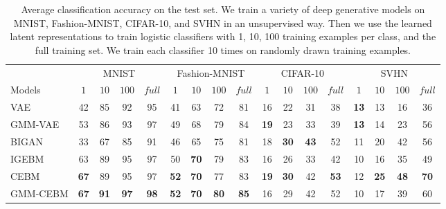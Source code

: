 \documentclass{article}
\begin{document}
\setlength{\tabcolsep}{6pt}
\begin{table}[!t]
\caption{Average classification accuracy on the test set. We train a variety of deep generative models on MNIST, Fashion-MNIST, CIFAR-10, and SVHN in an unsupervised way. Then we use the learned latent representations to train logistic classifiers with 1, 10, 100 training examples per class, and the full training set. We train each classifier 10 times on randomly drawn training examples.} 
\centering
\vspace*{0.5ex}
\begin{tabular}{l|cccc||cccc||cccc||cccc}
\toprule
 & \multicolumn{4}{c||}{MNIST} & \multicolumn{4}{c||}{Fashion-MNIST} & \multicolumn{4}{c||}{CIFAR-10} & \multicolumn{4}{c}{SVHN}\\
Models & $1$ & $10$  & $100$ & $full$ & $1$ & $10$  & $100$ & $full$ & $1$ & $10$  & $100$ & $full$ & $1$ & $10$  & $100$ & $full$ \\
\midrule
VAE & 42 & 85 & 92 & 95 & 41 & 63 & 72 & 81 & 16 & 22 & 31 & 38 & \textbf{13} & 13 & 16 & 36\\
GMM-VAE & 53 & 86 & 93 & 97 & 49 & 68 & 79 & 84 & \textbf{19} & 23 & 33 & 39 & \textbf{13} & 14 & 23 & 56  \\
BIGAN & 33 & 67 & 85 & 91 & 46 & 65 & 75 & 81 & 18 & \textbf{30} & \textbf{43} & 52 & 11 & 20 & 42 & 56  \\ 
\midrule
IGEBM & 63 & 89 & 95 & 97 & 50 & \textbf{70} & 79 & 83 & 16 & 26 & 33 & 42 & 10 & 16 & 35 & 49\\
CEBM & \textbf{67} & 89 & 95 & 97 & \textbf{52} & \textbf{70} & 77 & 83 & \textbf{19} & \textbf{30} & 42 & \textbf{53} & 12 & \textbf{25} & \textbf{48} & \textbf{70} \\
GMM-CEBM & \textbf{67} & \textbf{91} & \textbf{97} & \textbf{98} & \textbf{52} & \textbf{70} & \textbf{80} & \textbf{85} & 16 & 29 & 42 & 52 & 10 & 17 & 39 & 60 \\
\bottomrule
\end{tabular}
\label{tab:few-shot classification}
\end{table}
\end{document}
